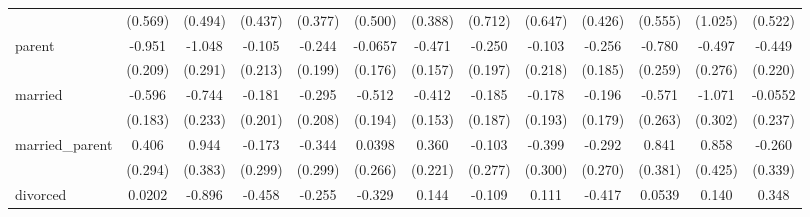{\begin{tabular}{l*{12}{c}}
                    &     (0.569)         &     (0.494)         &     (0.437)         &     (0.377)         &     (0.500)         &     (0.388)         &     (0.712)         &     (0.647)         &     (0.426)         &     (0.555)         &     (1.025)         &     (0.522)         \\
[1em]
parent              &      -0.951\sym{***}&      -1.048\sym{***}&      -0.105         &      -0.244         &     -0.0657         &      -0.471\sym{**} &      -0.250         &      -0.103         &      -0.256         &      -0.780\sym{**} &      -0.497         &      -0.449\sym{*}  \\
                    &     (0.209)         &     (0.291)         &     (0.213)         &     (0.199)         &     (0.176)         &     (0.157)         &     (0.197)         &     (0.218)         &     (0.185)         &     (0.259)         &     (0.276)         &     (0.220)         \\
[1em]
married             &      -0.596\sym{**} &      -0.744\sym{**} &      -0.181         &      -0.295         &      -0.512\sym{**} &      -0.412\sym{**} &      -0.185         &      -0.178         &      -0.196         &      -0.571\sym{*}  &      -1.071\sym{***}&     -0.0552         \\
                    &     (0.183)         &     (0.233)         &     (0.201)         &     (0.208)         &     (0.194)         &     (0.153)         &     (0.187)         &     (0.193)         &     (0.179)         &     (0.263)         &     (0.302)         &     (0.237)         \\
[1em]
married\_parent      &       0.406         &       0.944\sym{*}  &      -0.173         &      -0.344         &      0.0398         &       0.360         &      -0.103         &      -0.399         &      -0.292         &       0.841\sym{*}  &       0.858\sym{*}  &      -0.260         \\
                    &     (0.294)         &     (0.383)         &     (0.299)         &     (0.299)         &     (0.266)         &     (0.221)         &     (0.277)         &     (0.300)         &     (0.270)         &     (0.381)         &     (0.425)         &     (0.339)         \\
[1em]
divorced            &      0.0202         &      -0.896\sym{**} &      -0.458         &      -0.255         &      -0.329         &       0.144         &      -0.109         &       0.111         &      -0.417         &      0.0539         &       0.140         &       0.348         \\

\end{tabular}}
